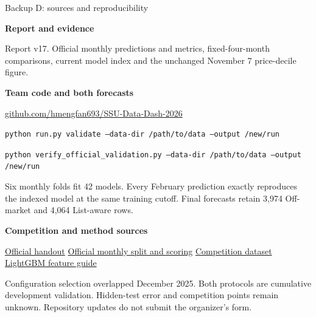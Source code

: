 \documentclass[aspectratio=169,20pt]{beamer}
\newcommand{\tinytext}{\fontsize{12}{15}\selectfont}
\newcommand{\sourceline}[1]{\par{\tinytext\color{Muted}#1\par}}
\begin{document}
\begin{frame}[t]{Backup D: sources and reproducibility}
\relax
{\fontsize{17}{22}\selectfont
\textbf{Report and evidence}

Report v17. Official monthly predictions and metrics, fixed-four-month comparisons, current model index and the unchanged November 7 price-decile figure.

\textbf{Team code and both forecasts}

\href{https://github.com/hmengfan693/SSU-Data-Dash-2026}{github.com/hmengfan693/SSU-Data-Dash-2026}

{\fontsize{15}{20}\selectfont
\texttt{python run.py validate --data-dir /path/to/data --output /new/run}\par
\texttt{python verify\_official\_validation.py --data-dir /path/to/data --output /new/run}\par}

Six monthly folds fit 42 models. Every February prediction exactly reproduces the indexed model at the same training cutoff. Final forecasts retain 3,974 Off-market and 4,064 List-aware rows.

\textbf{Competition and method sources}

\href{https://github.com/erwinzhang7/SSU-Data-Dash/blob/main/handout.md}{Official handout}\quad
\href{https://github.com/erwinzhang7/SSU-Data-Dash/blob/main/run.py}{Official monthly split and scoring}\quad
\href{https://huggingface.co/datasets/Baliyang/SSU_data_dash}{Competition dataset}\quad
\href{https://lightgbm.readthedocs.io/en/stable/Features.html}{LightGBM feature guide}
}
\vfill
\sourceline{Configuration selection overlapped December 2025. Both protocols are cumulative development validation. Hidden-test error and competition points remain unknown. Repository updates do not submit the organizer's form.}
\end{frame}
\fi
\end{document}
